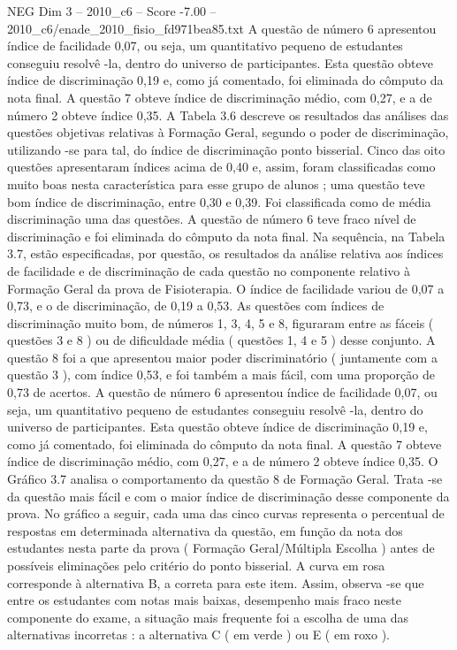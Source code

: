 \begin{textsample}{NEG Dim 3 – 2010\_c6 – Score -7.00 – 2010\_c6/enade\_2010\_fisio\_fd971bea85.txt}
A questão de número 6 apresentou índice de facilidade 0,07, ou seja, um quantitativo pequeno de estudantes conseguiu resolvê -la, dentro do universo de participantes.
Esta questão obteve índice de discriminação 0,19 e, como já comentado, foi eliminada do cômputo da nota final.
A questão 7 obteve índice de discriminação médio, com 0,27, e a de número 2 obteve índice 0,35.
A Tabela 3.6 descreve os resultados das análises das questões objetivas relativas à Formação Geral, segundo o poder de discriminação, utilizando -se para tal, do índice de discriminação ponto bisserial.
Cinco das oito questões apresentaram índices acima de 0,40 e, assim, foram classificadas como muito boas nesta característica para esse grupo de alunos ; uma questão teve bom índice de discriminação, entre 0,30 e 0,39.
Foi classificada como de média discriminação uma das questões.
A questão de número 6 teve fraco nível de discriminação e foi eliminada do cômputo da nota final.
Na sequência, na Tabela 3.7, estão especificadas, por questão, os resultados da análise relativa aos índices de facilidade e de discriminação de cada questão no componente relativo à Formação Geral da prova de Fisioterapia.
O índice de facilidade variou de 0,07 a 0,73, e o de discriminação, de 0,19 a 0,53.
As questões com índices de discriminação muito bom, de números 1, 3, 4, 5 e 8, figuraram entre as fáceis ( questões 3 e 8 ) ou de dificuldade média ( questões 1, 4 e 5 ) desse conjunto.
A questão 8 foi a que apresentou maior poder discriminatório ( juntamente com a questão 3 ), com índice 0,53, e foi também a mais fácil, com uma proporção de 0,73 de acertos.
A questão de número 6 apresentou índice de facilidade 0,07, ou seja, um quantitativo pequeno de estudantes conseguiu resolvê -la, dentro do universo de participantes.
Esta questão obteve índice de discriminação 0,19 e, como já comentado, foi eliminada do cômputo da nota final.
A questão 7 obteve índice de discriminação médio, com 0,27, e a de número 2 obteve índice 0,35.
O Gráfico 3.7 analisa o comportamento da questão 8 de Formação Geral.
Trata -se da questão mais fácil e com o maior índice de discriminação desse componente da prova.
No gráfico a seguir, cada uma das cinco curvas representa o percentual de respostas em determinada alternativa da questão, em função da nota dos estudantes nesta parte da prova ( Formação Geral/Múltipla Escolha ) antes de possíveis eliminações pelo critério do ponto bisserial.
A curva em rosa corresponde à alternativa B, a correta para este item.
Assim, observa -se que entre os estudantes com notas mais baixas, desempenho mais fraco neste componente do exame, a situação mais frequente foi a escolha de uma das alternativas incorretas : a alternativa C ( em verde ) ou E ( em roxo ).

\end{textsample}
